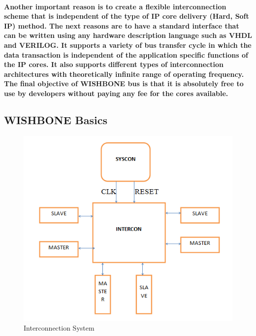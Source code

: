\documentclass[12pt,a4paper]{report}
\begin{document}
\paragraph{\textrm{\textmd{Another important reason is to create a flexible interconnection scheme
			that is independent of the type of IP core delivery (Hard, Soft IP) method. The next
			reasons are to have a standard interface that can be written using any hardware
			description language such as VHDL and VERILOG. It supports a variety of bus
			transfer cycle in which the data transaction is independent of the application specific
			functions of the IP cores. It also supports different types of interconnection architectures
			with theoretically infinite range of operating frequency. The final objective of
			WISHBONE bus is that it is absolutely free to use by developers without paying any fee
			for the cores available.}}}
\subsection{WISHBONE Basics }
\begin{figure}[h]
	\centering
	\includegraphics[scale=.6]{wb.png}
	\caption{Interconnection System}
	\label{fig:wb}
\end{figure}
\end{document}
